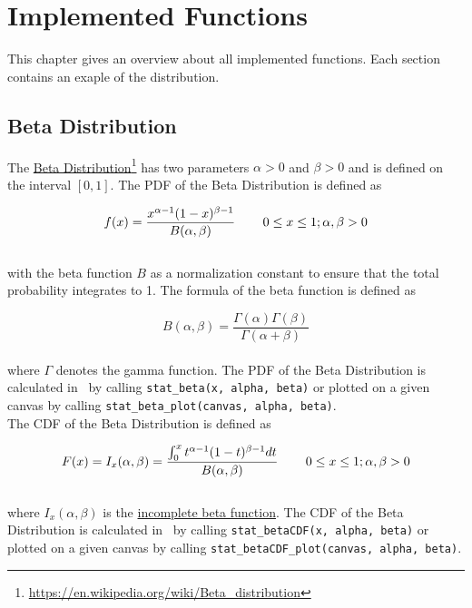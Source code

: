 
\chapter{Implemented Functions}

	This chapter gives an overview about all implemented functions. Each section contains an exaple of the distribution.

	\section{Beta Distribution} \label{sec:beta_distribution}

		The \href{https://en.wikipedia.org/wiki/Beta_distribution}{Beta Distribution}\footnote{\url{https://en.wikipedia.org/wiki/Beta_distribution}} has two parameters $\alpha > 0$ and $\beta > 0$ and is defined on the interval $[0,1]$. The \ac{PDF} of the Beta Distribution is defined as

		$$f(x) = \frac{x^{\alpha-1}(1-x)^{\beta-1}}{B(\alpha,\beta)}  \hspace{.3in} 0 \le x \le 1; \alpha, \beta > 0$$
		\\[0.3cm]		
		with the beta function $B$ as a normalization constant to ensure that the total probability integrates to 1. The formula of the beta function is defined as

		$$B(\alpha,\beta) = \frac{\Gamma(\alpha)\Gamma(\beta)}{\Gamma(\alpha + \beta)}$$
		\\[0.3cm]
		where $\Gamma$ denotes the gamma function. The \ac{PDF} of the Beta Distribution is calculated in \setlx\ by calling \lstinline{stat_beta(x, alpha, beta)} or plotted on a given canvas by calling \lstinline{stat_beta_plot(canvas, alpha, beta)}.
		\\[0.3cm]		
		The \ac{CDF} of the Beta Distribution is defined as

		$$F(x) = I_{x}(\alpha,\beta) = \frac{\int_{0}^{x}{t^{\alpha-1}(1-t)^{\beta-1}dt}}{B(\alpha,\beta)} \hspace{.3in} 0 \le x \le 1; \alpha, \beta > 0$$
		\\[0.3cm]
		where $I_{x}(\alpha,\beta)$ is the \href{https://en.wikipedia.org/wiki/Beta_function#Incomplete_beta_function}{incomplete beta function}.
		The \ac{CDF} of the Beta Distribution is calculated in \setlx\ by calling \lstinline{stat_betaCDF(x, alpha, beta)} or plotted on a given canvas by calling \lstinline{stat_betaCDF_plot(canvas, alpha, beta)}.

